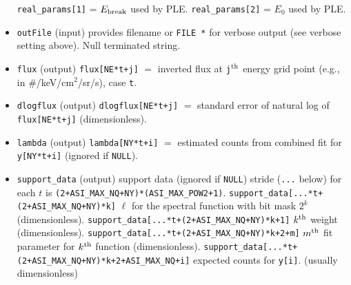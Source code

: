 \documentclass{article}    %
\begin{document}
\begin{itemize}
\subitem \verb|real_params[1]| = $E_{\rm break}$ used by PLE.
\subitem \verb|real_params[2]| = $E_0$ used by PLE.
\item \verb|outFile| (input) provides filename or \verb|FILE *| for verbose output (see verbose setting above). Null terminated string.
\item \verb|flux| (output) \verb|flux[NE*t+j]| $=$ inverted flux at \verb|j|$^{\rm th}$ energy grid point (e.g., in \#/keV/cm$^2$/sr/s), case \verb|t|.
\item \verb|dlogflux| (output) \verb|dlogflux[NE*t+j]| $=$ standard error of natural log of \verb|flux[NE*t+j]| (dimensionless).
\item \verb|lambda| (output) \verb|lambda[NY*t+i]| $=$ estimated counts from combined fit for \verb|y[NY*t+i]| (ignored if \verb|NULL|).
\item \verb|support_data| (output) support data (ignored if \verb|NULL|)
\subitem stride (\verb|...| below) for each $t$ is \verb|(2+ASI_MAX_NQ+NY)*(ASI_MAX_POW2+1)|. 
\subitem \verb|support_data[...*t+(2+ASI_MAX_NQ+NY)*k]| $\ell$ for the spectral function with bit mask $2^k$ (dimensionless).
\subitem \verb|support_data[...*t+(2+ASI_MAX_NQ+NY)*k+1]| $k^{\rm th}$ weight  (dimensionless).
\subitem \verb|support_data[...*t+(2+ASI_MAX_NQ+NY)*k+2+m]| $m^{\rm th}$ fit parameter for $k^{\rm th}$ function  (dimensionless).
\subitem \verb|support_data[...*t+(2+ASI_MAX_NQ+NY)*k+2+ASI_MAX_NQ+i]| expected counts for \verb|y[i]|. (usually dimensionless)
\end{itemize}
\end{document}
